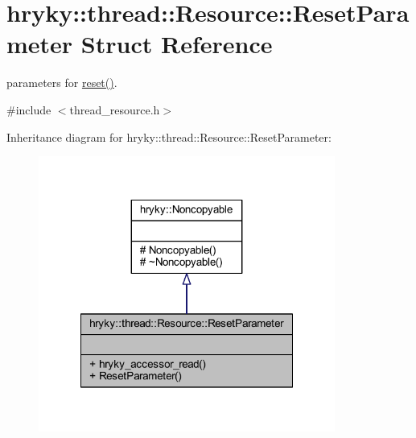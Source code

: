 \hypertarget{structhryky_1_1thread_1_1_resource_1_1_reset_parameter}{\section{hryky\-:\-:thread\-:\-:Resource\-:\-:Reset\-Parameter Struct Reference}
\label{structhryky_1_1thread_1_1_resource_1_1_reset_parameter}
}


parameters for \hyperlink{classhryky_1_1thread_1_1_resource_a1456f170e50e126104346013f1436b51}{reset()}.  




{\ttfamily \#include $<$thread\-\_\-resource.\-h$>$}



Inheritance diagram for hryky\-:\-:thread\-:\-:Resource\-:\-:Reset\-Parameter\-:
\nopagebreak
\begin{figure}[H]
\begin{center}
\leavevmode
\includegraphics[width=276pt]{structhryky_1_1thread_1_1_resource_1_1_reset_parameter__inherit__graph}
\end{center}
\end{figure}
